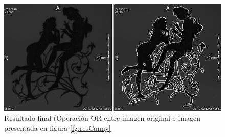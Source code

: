 \documentclass{article}
\begin{document}
\begin{figure}[ht]
\begin{center}
\includegraphics[width=1.0\textwidth]{4sintesis/cannyfinal.png} %
\caption{Resultado final (Operación OR entre imagen original e imagen presentada en figura \ref{fg:resCanny}}
\label{fg:finSintesis}
\end{center}
\end{figure}
\FloatBarrier

\nocite{*}
\FloatBarrier





\end{document}
